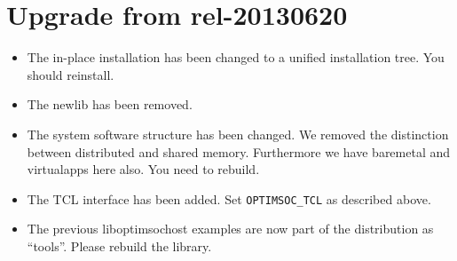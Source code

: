 \section{Upgrade from rel-20130620}

\begin{itemize}
\item The in-place installation has been changed to a unified
  installation tree. You should reinstall.
\item The newlib has been removed.
\item The system software structure has been changed. We removed the
  distinction between distributed and shared memory. Furthermore we
  have baremetal and virtualapps here also. You need to rebuild.
\item The TCL interface has been added. Set \verb|OPTIMSOC_TCL| as
  described above.
\item The previous liboptimsochost examples are now part of the
  distribution as ``tools''. Please rebuild the library.
\end{itemize}